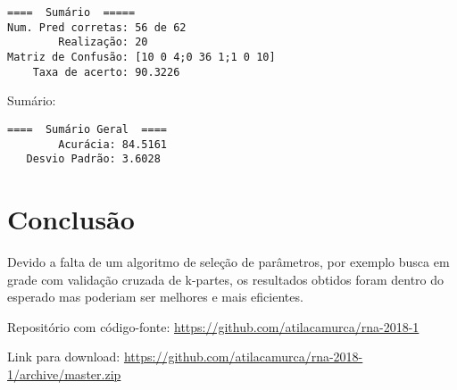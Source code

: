 \begin{verbatim}
====  Sumário  =====
Num. Pred corretas: 56 de 62
        Realização: 20
Matriz de Confusão: [10 0 4;0 36 1;1 0 10]
    Taxa de acerto: 90.3226
\end{verbatim}

Sumário:

\begin{verbatim}
====  Sumário Geral  ====
        Acurácia: 84.5161
   Desvio Padrão: 3.6028
\end{verbatim}

\section{Conclusão}

Devido a falta de um algoritmo de seleção de parâmetros, por exemplo
busca em grade com validação cruzada de k-partes, os resultados obtidos
foram dentro do esperado mas poderiam ser melhores e mais eficientes.

Repositório com código-fonte:
\url{https://github.com/atilacamurca/rna-2018-1}

Link para download:
\url{https://github.com/atilacamurca/rna-2018-1/archive/master.zip}
